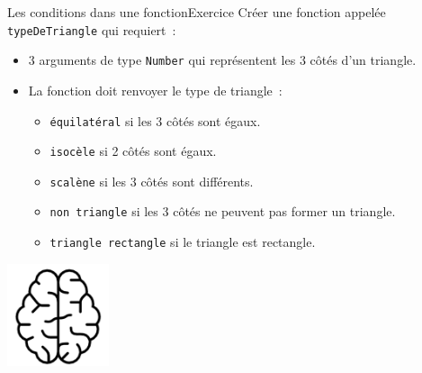 \documentclass{beamer}
\begin{document}
    \begin{frame}{Les conditions dans une fonction}{Exercice \execcounterdispinc{}}
        Créer une fonction appelée \lstinline{typeDeTriangle} qui requiert~:
        \begin{itemize}
            \item 3 arguments de type \lstinline{Number} qui représentent les 3 côtés d'un triangle.
            \item La fonction doit renvoyer le type de triangle~:
            \begin{itemize}
                \item \lstinline{équilatéral} si les 3 côtés sont égaux.
                \item \lstinline{isocèle} si 2 côtés sont égaux.
                \item \lstinline{scalène} si les 3 côtés sont différents.
                \item \lstinline{non triangle} si les 3 côtés ne peuvent pas former un triangle.
                \item \lstinline{triangle rectangle} si le triangle est rectangle.
            \end{itemize}
        \end{itemize}
        \bigbreak
        \centering
        \includegraphics[width=3cm]{image/intelligence}
    \end{frame}
\end{document}

